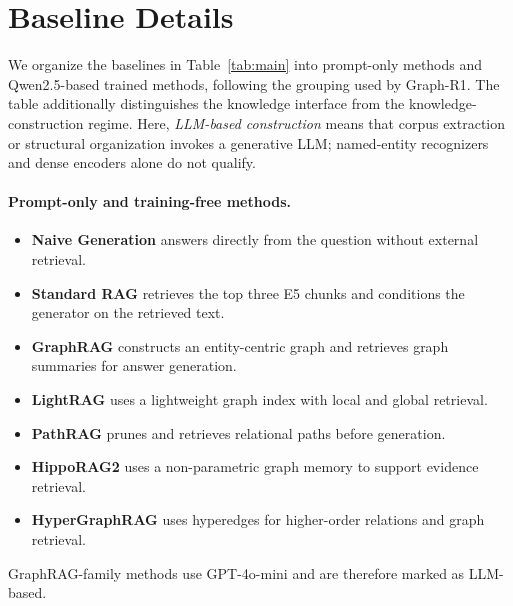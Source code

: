 \documentclass[letterpaper]{article} %
\begin{document}
\section{Baseline Details}
\label{app:baselines}

We organize the baselines in Table~\ref{tab:main} into prompt-only methods and Qwen2.5-based trained methods, following the grouping used by Graph-R1. The table additionally distinguishes the knowledge interface from the knowledge-construction regime. Here, \emph{LLM-based construction} means that corpus extraction or structural organization invokes a generative LLM; named-entity recognizers and dense encoders alone do not qualify.

\paragraph{Prompt-only and training-free methods.}
\begin{itemize}
    \item \textbf{Naive Generation} answers directly from the question without external retrieval.
    \item \textbf{Standard RAG} \citep{lewis2020rag} retrieves the top three E5 chunks \citep{wang2022e5} and conditions the generator on the retrieved text.
    \item \textbf{GraphRAG} \citep{edge2024graphrag} constructs an entity-centric graph and retrieves graph summaries for answer generation.
    \item \textbf{LightRAG} \citep{guo2024lightrag} uses a lightweight graph index with local and global retrieval.
    \item \textbf{PathRAG} \citep{chen2025pathrag} prunes and retrieves relational paths before generation.
    \item \textbf{HippoRAG2} \citep{gutierrez2025hipporag2} uses a non-parametric graph memory to support evidence retrieval.
    \item \textbf{HyperGraphRAG} \citep{luo2025hypergraphrag} uses hyperedges for higher-order relations and graph retrieval.
\end{itemize}
GraphRAG-family methods use GPT-4o-mini and are therefore marked as LLM-based.
\end{document}
